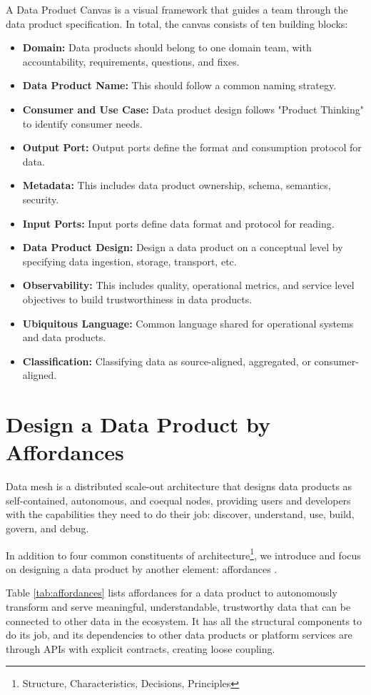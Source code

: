 \documentclass[12pt, a4paper]{book}
\begin{document}
A Data Product Canvas is a visual framework that guides a team through the data product specification. In total, the canvas consists of ten building blocks:
	\begin{itemize}[nosep]
		\item \textbf{Domain:} Data products should belong to one domain team, with accountability, requirements, questions, and fixes.
		\item \textbf{Data Product Name:} This should follow a common naming strategy.
		\item \textbf{Consumer and Use Case:} Data product design follows "Product Thinking" to identify consumer needs.
		\item \textbf{Output Port:} Output ports define the format and consumption protocol for data.
		\item \textbf{Metadata:} This includes data product ownership, schema, semantics, security.
		\item \textbf{Input Ports:} Input ports define data format and protocol for reading.
		\item \textbf{Data Product Design:} Design a data product on a conceptual level by specifying data ingestion, storage, transport, etc.
		\item \textbf{Observability:} This includes quality, operational metrics, and service level objectives to build trustworthiness in data products.
		\item \textbf{Ubiquitous Language:} Common language shared for operational systems and data products.
		\item \textbf{Classification:} Classifying data as source-aligned, aggregated, or consumer-aligned.
	\end{itemize}


\section{Design a Data Product by Affordances}
Data mesh is a distributed scale-out architecture that designs data products as self-contained, autonomous, and coequal nodes, providing users and developers with the capabilities they need to do their job: discover, understand, use, build, govern, and debug.

In addition to four common constituents of architecture\footnote{Structure, Characteristics, Decisions, Principles}, we introduce and focus on designing a data product by another element: affordances \cite{norman2002design}.

Table \ref{tab:affordances} lists affordances for a data product to autonomously transform and serve meaningful, understandable, trustworthy data that can be connected to other data in the ecosystem. It has all the structural components to do its job, and its dependencies to other data products or platform services are through APIs with explicit contracts, creating loose coupling.
\end{document}
